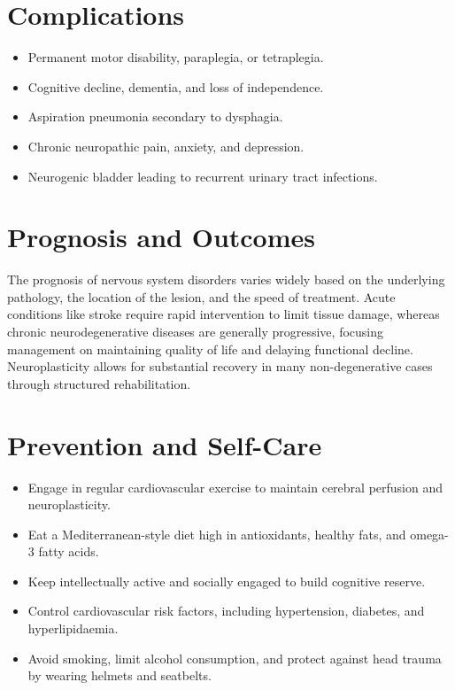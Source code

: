 \section*{Complications}
\begin{itemize}
    \item Permanent motor disability, paraplegia, or tetraplegia.
    \item Cognitive decline, dementia, and loss of independence.
    \item Aspiration pneumonia secondary to dysphagia.
    \item Chronic neuropathic pain, anxiety, and depression.
    \item Neurogenic bladder leading to recurrent urinary tract infections.
\end{itemize}

\section*{Prognosis and Outcomes}
The prognosis of nervous system disorders varies widely based on the underlying pathology, the location of the lesion, and the speed of treatment. Acute conditions like stroke require rapid intervention to limit tissue damage, whereas chronic neurodegenerative diseases are generally progressive, focusing management on maintaining quality of life and delaying functional decline. Neuroplasticity allows for substantial recovery in many non-degenerative cases through structured rehabilitation.

\section*{Prevention and Self-Care}
\begin{itemize}
    \item Engage in regular cardiovascular exercise to maintain cerebral perfusion and neuroplasticity.
    \item Eat a Mediterranean-style diet high in antioxidants, healthy fats, and omega-3 fatty acids.
    \item Keep intellectually active and socially engaged to build cognitive reserve.
    \item Control cardiovascular risk factors, including hypertension, diabetes, and hyperlipidaemia.
    \item Avoid smoking, limit alcohol consumption, and protect against head trauma by wearing helmets and seatbelts.
\end{itemize}

